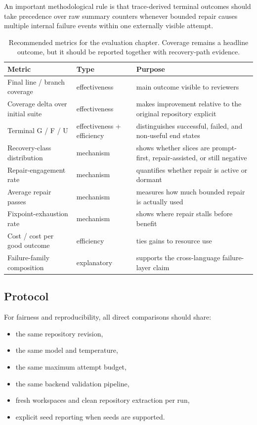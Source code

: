 \documentclass[10pt]{article}
\begin{document}
An important methodological rule is that trace-derived terminal outcomes should take precedence over raw summary counters whenever bounded repair causes multiple internal failure events within one externally visible attempt.

\begin{table}[t]
\centering
\small
\begin{tabularx}{\textwidth}{>{\raggedright\arraybackslash}p{} >{\raggedright\arraybackslash}p{} >{\raggedright\arraybackslash}X}
\toprule
Metric & Type & Purpose \\
\midrule
Final line / branch coverage & effectiveness & main outcome visible to reviewers \\
Coverage delta over initial suite & effectiveness & makes improvement relative to the original repository explicit \\
Terminal G / F / U & effectiveness + efficiency & distinguishes successful, failed, and non-useful end states \\
Recovery-class distribution & mechanism & shows whether slices are prompt-first, repair-assisted, or still negative \\
Repair-engagement rate & mechanism & quantifies whether repair is active or dormant \\
Average repair passes & mechanism & measures how much bounded repair is actually used \\
Fixpoint-exhaustion rate & mechanism & shows where repair stalls before benefit \\
Cost / cost per good outcome & efficiency & ties gains to resource use \\
Failure-family composition & explanatory & supports the cross-language failure-layer claim \\
\bottomrule
\end{tabularx}
\caption{Recommended metrics for the evaluation chapter. Coverage remains a headline outcome, but it should be reported together with recovery-path evidence.}
\label{tab:eval-metrics}
\end{table}

\subsection{Protocol}

For fairness and reproducibility, all direct comparisons should share:
\begin{itemize}[leftmargin=1.4em]
    \item the same repository revision,
    \item the same model and temperature,
    \item the same maximum attempt budget,
    \item the same backend validation pipeline,
    \item fresh workspaces and clean repository extraction per run,
    \item explicit seed reporting when seeds are supported.
\end{itemize}
\end{document}
